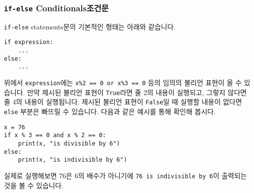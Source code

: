 \documentclass[../main.tex]{subfiles}
\begin{document}
\subsubsection{\texttt{if-else} Conditionals조건문}
\texttt{if-else} statements문의 기본적인 형태는 아래와 같습니다.
\begin{verbatim}
if expression:
    ...
else:
    ...
\end{verbatim}
위에서 \texttt{expression}에는 \texttt{x\%2 == 0 or x\%3 == 0} 등의 임의의
불리언 표현이 올 수 있습니다.  만약 제시된 불리언 표현이 \texttt{True}라면 줄
2의 내용이 실행되고, 그렇지 않다면 줄 4의 내용이 실행됩니다.  제시된 불리언
표현이 \texttt{False}일 때 실행할 내용이 없다면 \texttt{else} 부분은 빠뜨릴 수
있습니다.
다음과 같은 예시를 통해 확인해 봅시다.
\begin{verbatim}
x = 76
if x % 3 == 0 and x % 2 == 0:
    print(x, "is divisible by 6")
else:
    print(x, "is indivisible by 6")
\end{verbatim}
실제로 실행해보면 76은 6의 배수가 아니기에 \texttt{76 is indivisible by 6}이
출력되는 것을 볼 수 있습니다.
\end{document}
